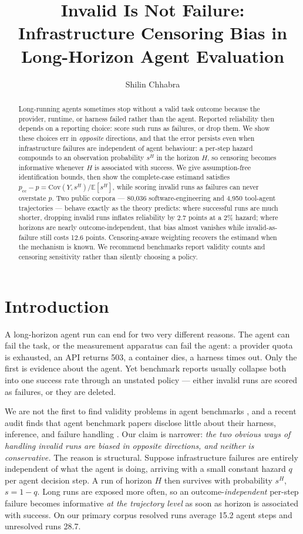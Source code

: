 \documentclass[letterpaper]{article}
\title{Invalid Is Not Failure:\\
Infrastructure Censoring Bias in Long-Horizon Agent Evaluation}
\author{
    Shilin Chhabra
}
\begin{document}
\maketitle

\begin{abstract}
Long-running agents sometimes stop without a valid task outcome because the
provider, runtime, or harness failed rather than the agent. Reported reliability
then depends on a reporting choice: score such runs as failures, or drop them.
We show these choices err in \emph{opposite} directions, and that the error
persists even when infrastructure failures are independent of agent behaviour: a
per-step hazard compounds to an observation probability $s^{H}$ in the horizon
$H$, so censoring becomes informative whenever $H$ is associated with success.
We give assumption-free identification bounds, then show the complete-case
estimand satisfies $p_{\mathrm{cc}}-p=\mathrm{Cov}(Y,s^{H})/\mathbb{E}[s^{H}]$,
while scoring invalid runs as failures can never overstate $p$. Two public
corpora --- 80{,}036 software-engineering and 4{,}950 tool-agent trajectories
--- behave exactly as the theory predicts: where successful runs are much
shorter, dropping invalid runs inflates reliability by 2.7 points at a 2\%
hazard; where horizons are nearly outcome-independent, that bias almost
vanishes while invalid-as-failure still costs 12.6 points. Censoring-aware
weighting recovers the estimand when the mechanism is known. We recommend
benchmarks report validity counts and censoring sensitivity rather than silently
choosing a policy.
\end{abstract}

\section{Introduction}

A long-horizon agent run can end for two very different reasons. The agent can
fail the task, or the measurement apparatus can fail the agent: a provider quota
is exhausted, an API returns 503, a container dies, a harness times out. Only
the first is evidence about the agent. Yet benchmark reports usually collapse
both into one success rate through an unstated policy --- either invalid runs
are scored as failures, or they are deleted.

We are not the first to find validity problems in agent benchmarks
\citep{kapoor2024agentsthatmatter,weidinger2025evalscience,zhu2026guardrails},
and a recent audit finds that agent benchmark papers disclose little about their
harness, inference, and failure handling \citep{moghadasi2026disclose}. Our
claim is narrower: \emph{the two obvious ways of handling invalid runs are
biased in opposite directions, and neither is conservative.} The reason is
structural. Suppose infrastructure failures are entirely independent of what the
agent is doing, arriving with a small constant hazard $q$ per agent decision
step. A run of horizon $H$ then survives with probability $s^{H}$, $s=1-q$.
Long runs are exposed more often, so an outcome-\emph{independent} per-step
failure becomes informative \emph{at the trajectory level} as soon as horizon is
associated with success. On our primary corpus resolved runs average 15.2 agent
steps and unresolved runs 28.7.
\end{document}
